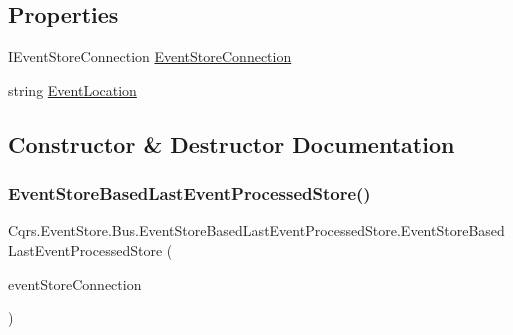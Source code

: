 \subsection*{Properties}
\begin{DoxyCompactItemize}
\item 
I\+Event\+Store\+Connection \hyperlink{classCqrs_1_1EventStore_1_1Bus_1_1EventStoreBasedLastEventProcessedStore_acce685c2420cae5df4291fea96e20e64}{Event\+Store\+Connection}
\item 
string \hyperlink{classCqrs_1_1EventStore_1_1Bus_1_1EventStoreBasedLastEventProcessedStore_a3f4ac10a5ede43130099f2d1b421ea1c}{Event\+Location}
\end{DoxyCompactItemize}


\subsection{Constructor \& Destructor Documentation}
\mbox{\label{classCqrs_1_1EventStore_1_1Bus_1_1EventStoreBasedLastEventProcessedStore_a54dc3860c38026fd298bd204e3079490}} 
\subsubsection{\texorpdfstring{Event\+Store\+Based\+Last\+Event\+Processed\+Store()}{EventStoreBasedLastEventProcessedStore()}}
{\footnotesize\ttfamily Cqrs.\+Event\+Store.\+Bus.\+Event\+Store\+Based\+Last\+Event\+Processed\+Store.\+Event\+Store\+Based\+Last\+Event\+Processed\+Store (\begin{DoxyParamCaption}\item[{I\+Event\+Store\+Connection}]{event\+Store\+Connection }\end{DoxyParamCaption})}



